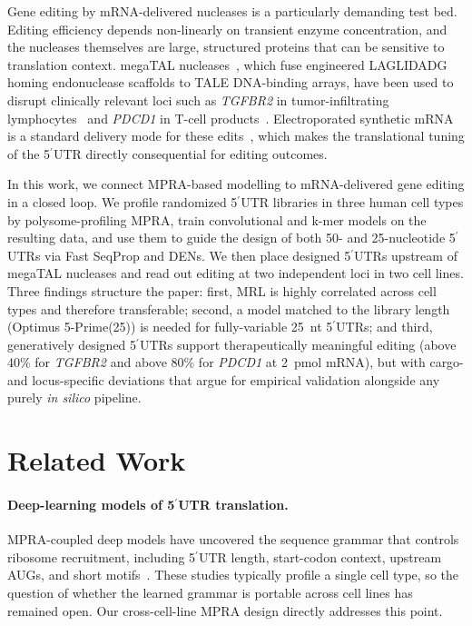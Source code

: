 \documentclass[11pt]{article}
\begin{document}
Gene editing by mRNA-delivered nucleases is a particularly demanding
test bed. Editing efficiency depends non-linearly on transient enzyme
concentration, and the nucleases themselves are large, structured
proteins that can be sensitive to translation context. megaTAL
nucleases~\citep{mcmurrough2018laglidadg,laforet2019endonuclease,
gwiazda2016tcellediting}, which fuse engineered LAGLIDADG homing
endonuclease scaffolds to TALE DNA-binding arrays, have been used to
disrupt clinically relevant loci such as \emph{TGFBR2} in
tumor-infiltrating lymphocytes~\citep{fix2022tgfbr2} and \emph{PDCD1}
in T-cell
products~\citep{mohammad2025pd1}. Electroporated synthetic mRNA is
a standard delivery mode for these
edits~\citep{schwarze2021electroporation,gwiazda2016tcellediting},
which makes the translational tuning of the 5$^\prime$UTR directly
consequential for editing outcomes.

In this work, we connect MPRA-based modelling to mRNA-delivered
gene editing in a closed loop. We profile randomized 5$^\prime$UTR
libraries in three human cell types by polysome-profiling MPRA, train
convolutional and k-mer models on the resulting data, and use them to
guide the design of both 50- and 25-nucleotide 5$^\prime$UTRs via Fast
SeqProp and DENs. We then place designed 5$^\prime$UTRs upstream of
megaTAL nucleases and read out editing at two independent loci in two
cell lines. Three findings structure the paper: first, MRL is highly
correlated across cell types and therefore transferable; second, a
model matched to the library length (Optimus 5-Prime(25)) is needed
for fully-variable 25~nt 5$^\prime$UTRs; and third, generatively
designed 5$^\prime$UTRs support therapeutically meaningful editing
(above 40\% for \emph{TGFBR2} and above 80\% for \emph{PDCD1} at
2~pmol mRNA), but with cargo- and locus-specific deviations that argue
for empirical validation alongside any purely \emph{in silico}
pipeline.

\section{Related Work}

\paragraph{Deep-learning models of 5$^\prime$UTR translation.}
MPRA-coupled deep models have uncovered the sequence grammar that
controls ribosome recruitment, including 5$^\prime$UTR length,
start-codon context, upstream AUGs, and short
motifs~\citep{reimaopinto2025danio5p,strayer2024naptrap,
chaldebas2026utrvariants}. These studies typically profile a single
cell type, so the question of whether the learned grammar is
portable across cell lines has remained open. Our cross-cell-line
MPRA design directly addresses this point.
\end{document}
